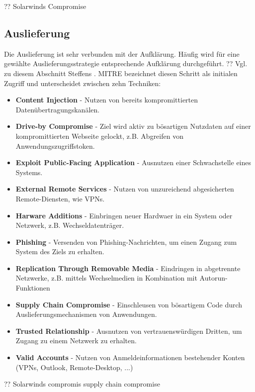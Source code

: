 \documentclass[conference]{IEEEtran}
\begin{document}
?? Solarwinds Compromise

\subsection{Auslieferung}
Die Auslieferung ist sehr verbunden mit der Aufklärung.
Häufig wird für eine gewählte Auslieferungsstrategie entsprechende Aufklärung durchgeführt.
??
Vgl. zu diesem Abschnitt Steffens \cite[S.~10-13]{Steffens2020}.
MITRE \cite{MITREInitialAccess} bezeichnet diesen Schritt als initialen Zugriff und unterscheidet zwischen zehn Techniken:
\begin{itemize}
    \item \textbf{Content Injection} - Nutzen von bereits kompromittierten Datenübertragungskanälen.
    \item \textbf{Drive-by Compromise} - Ziel wird aktiv zu bösartigen Nutzdaten auf einer kompromittierten Webseite gelockt, z.B. Abgreifen von Anwendungszugriffstoken.
    \item \textbf{Exploit Public-Facing Application} - Ausnutzen einer Schwachstelle eines Systems.
    \item \textbf{External Remote Services} - Nutzen von unzureichend abgesicherten Remote-Diensten, wie VPNs.
    \item \textbf{Harware Additions} - Einbringen neuer Hardwaer in ein System oder Netzwerk, z.B. Wechseldatenträger.
    \item \textbf{Phishing} - Versenden von Phishing-Nachrichten, um einen Zugang zum System des Ziels zu erhalten.
    \item \textbf{Replication Through Removable Media} - Eindringen in abgetrennte Netzwerke, z.B. mittels Wechselmedien in Kombination mit Autorun-Funktionen
    \item \textbf{Supply Chain Compromise} - Einschleusen von bösartigem Code durch Auslieferungsmechanismen von Anwendungen.
    \item \textbf{Trusted Relationship} - Ausnutzen von vertrauenswürdigen Dritten, um Zugang zu einem Netzwerk zu erhalten.
    \item \textbf{Valid Accounts} - Nutzen von Anmeldeinformationen bestehender Konten (VPNs, Outlook, Remote-Desktop, ...)
\end{itemize}

?? Solarwinds compromis supply chain compromise
\end{document}
